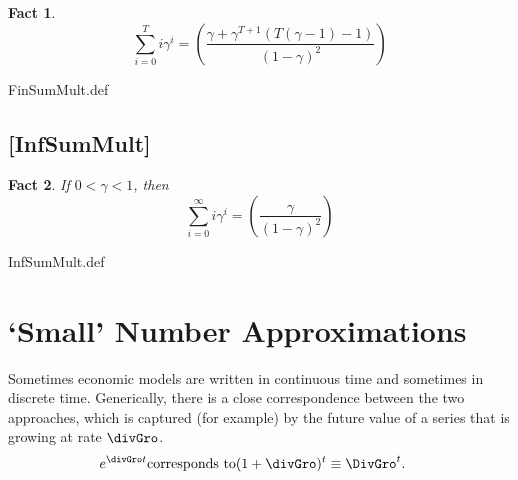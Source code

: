 \documentclass{handout}
\newtheorem{Fact}{Fact}
\providecommand{\currentpdfbookmark}{}
\begin{document}

\begin{Fact} 
\begin{equation}
\displaystyle \sum_{i=0}^{T} i \gamma^{i} = \left(\frac{\gamma + \gamma^{T+1}(T(\gamma-1)-1)}{(1-\gamma)^{2}}\right)
\end{equation} 
\end{Fact}

\begin{verbatimwrite}{FinSumMult.def}
\providecommand{\FinSumMult}{\href{http://www.econ2.jhu.edu/people/ccarroll/public/LectureNotes/MathFacts/MathFactsList\#FinSumMult}{\ensuremath{\mathtt{[FinSumMult]}}}}
\end{verbatimwrite}


\hypertarget{InfSumMult}{}

\subsection{[InfSumMult]}\label{fact:InfSumMult}


\begin{Fact} If $0 < \gamma < 1$, then
\begin{equation}
\displaystyle \sum_{i=0}^{\infty} i \gamma^{i} = \left(\frac{\gamma}{(1-\gamma)^{2}}\right)
\end{equation}
\end{Fact}

\begin{verbatimwrite}{InfSumMult.def}
\providecommand{\InfSumMult}{\href{http://www.econ2.jhu.edu/people/ccarroll/public/LectureNotes/MathFacts/MathFactsList\#InfSumMult}{\ensuremath{\mathtt{[InfSumMult]}}}}
\end{verbatimwrite}

\medskip\medskip

\section{`Small' Number Approximations}

Sometimes economic models are written in continuous time and sometimes
in discrete time.  Generically, there is a close
correspondence between the two approaches, which is captured (for
example) by the future value of a series that is growing at rate
$\divGro$.  
\begin{equation}\begin{gathered}\begin{aligned}
  e^{\divGro t} & \text{corresponds to}  (1+\divGro)^{t} \equiv \DivGro^{t}.
\end{aligned}\end{gathered}\end{equation}
\end{document}
